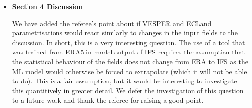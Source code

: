 \documentclass[10pt]{article}
\begin{document}
\begin{itemize}
	
	\item \textbf{Section 4 Discussion}
	
	We have added the referee's point about if VESPER and ECLand parametrisations would react similarly to changes in the input fields to the discussion. In short, this is a very interesting question. The use of a tool that was trained from ERA5 in model output of IFS requires the assumption that the statistical behaviour of the fields does not change from ERA to IFS as the ML model would otherwise be forced to extrapolate (which it will not be able to do). This is a fair assumption, but it would be interesting to investigate this quantitively in greater detail. We defer the investigation of this question to a future work and thank the referee for raising a good point.
	
	
	
	
\end{itemize}
\end{document}
